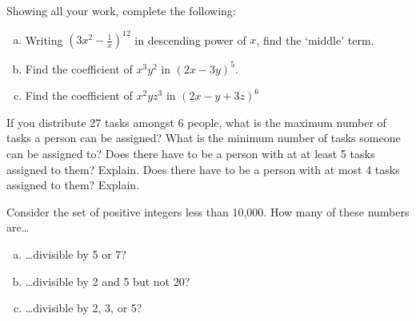 \documentclass[11pt,letterpaper]{article}
\begin{document}

 Showing all your work, complete the following:
	\begin{enumerate}[(a)]
	\item Writing $\left(3x^2 - \frac{1}{x} \right)^{12}$ in descending power of $x$, find the `middle' term. 
	\item Find the coefficient of $x^3y^2$ in $(2x - 3y)^5$.
	\item Find the coefficient of $x^2yz^3$ in $(2x - y + 3z)^6$
	\end{enumerate}



\newpage



 If you distribute 27 tasks amongst 6 people, what is the maximum number of tasks a person can be assigned? What is the minimum number of tasks someone can be assigned to? Does there have to be a person with at at least 5 tasks assigned to them? Explain. Does there have to be a person with at most 4 tasks assigned to them? Explain. 



\newpage



 Consider the set of positive integers less than 10,000. How many of these numbers are\dots
	\begin{enumerate}[(a)]
	\item \dots divisible by 5 or 7?
	\item \dots divisible by 2 and 5 but not 20?
	\item \dots divisible by 2, 3, or 5?
	\end{enumerate}
\end{document}
